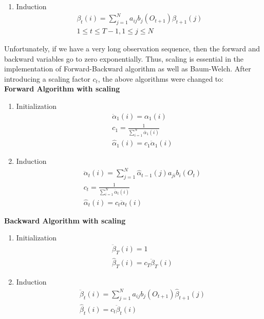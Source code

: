 \documentclass[twoside]{article}
\begin{document}
\begin{multicols}{2}
\begin{enumerate}
\item Induction
\begin{multline}
\beta_t(i) = \sum_{j=1}^N a_{ij}b_j(O_{t+1})\beta_{t+1}(j) \\1 \leq t \leq T-1, 1 \leq j \leq N
\end{multline}
\end{enumerate}
Unfortunately, if we have a very long observation sequence, then the forward and backward variables go to zero exponentially. Thus, scaling is essential in the implementation of Forward-Backward algorithm as well as Baum-Welch. After introducing a scaling factor $c_t$, the above algorithms were changed to:\\
\textbf{Forward Algorithm with scaling}
\begin{enumerate}
\item Initialization
\begin{equation}
\begin{aligned}
&\ddot{\alpha}_1(i) = \alpha_1(i) \\
&c_1 = \frac{1}{\sum_{i=1}^N\ddot{\alpha_1}(i)}\\
&\hat{\alpha}_1(i) = c_1\ddot{\alpha}_1(i)
\end{aligned}
\end{equation}
\item Induction
\begin{equation}
\begin{aligned}
&\ddot{\alpha}_t(i) = \sum_{j=1}^N\hat{\alpha}_{t-1}(j)a_{ji}b_i(O_t)\\
&c_t = \frac{1}{\sum_{i=1}^N \ddot{\alpha}_t(i)}\\
&\hat{\alpha}_t(i) = c_t \ddot{\alpha}_t(i)
\end{aligned}
\end{equation}
\end{enumerate}
\textbf{Backward Algorithm with scaling}
\begin{enumerate}
\item Initialization
\begin{equation}
\begin{aligned}
&\ddot{\beta}_T(i) = 1\\
&\hat{\beta}_T(i) = c_T \ddot{\beta}_T(i)
\end{aligned}
\end{equation}
\item Induction
\begin{equation}
\begin{aligned}
& \ddot{\beta}_t(i) = \sum_{j=1}^N a_{ij}b_j(O_{t+1})\hat{\beta}_{t+1}(j)\\
&\hat{\beta}_t(i) = c_t\ddot{\beta}_t(i)
\end{aligned}
\end{equation}
\end{enumerate}


\end{multicols}
\end{document}
